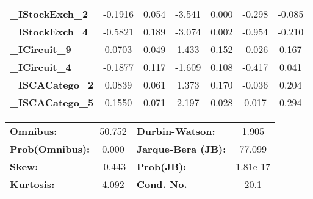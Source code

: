 \begin{table}[H]
\begin{center}
\begin{tabular}{lcccccc}
\textbf{\_IStockExch\_2}               &      -0.1916  &        0.054     &    -3.541  &         0.000        &       -0.298    &       -0.085     \\
\textbf{\_IStockExch\_4}               &      -0.5821  &        0.189     &    -3.074  &         0.002        &       -0.954    &       -0.210     \\
\textbf{\_ICircuit\_9}                 &       0.0703  &        0.049     &     1.433  &         0.152        &       -0.026    &        0.167     \\
\textbf{\_ICircuit\_4}                 &      -0.1877  &        0.117     &    -1.609  &         0.108        &       -0.417    &        0.041     \\
\textbf{\_ISCACatego\_2}               &       0.0839  &        0.061     &     1.373  &         0.170        &       -0.036    &        0.204     \\
\textbf{\_ISCACatego\_5}               &       0.1550  &        0.071     &     2.197  &         0.028        &        0.017    &        0.294     \\
\bottomrule
\end{tabular}
\begin{tabular}{lclc}
\textbf{Omnibus:}       & 50.752 & \textbf{  Durbin-Watson:     } &    1.905  \\
\textbf{Prob(Omnibus):} &  0.000 & \textbf{  Jarque-Bera (JB):  } &   77.099  \\
\textbf{Skew:}          & -0.443 & \textbf{  Prob(JB):          } & 1.81e-17  \\
\textbf{Kurtosis:}      &  4.092 & \textbf{  Cond. No.          } &     20.1  \\
\bottomrule
\end{tabular}
\end{center}\end{table}

\clearpage


